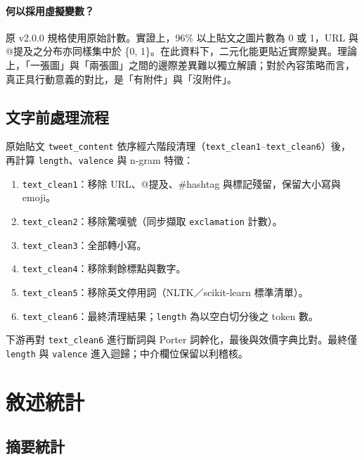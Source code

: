 \documentclass[12pt,a4paper]{ctexart}
\begin{document}
\paragraph{何以採用虛擬變數？}原 v2.0.0 規格使用原始計數。實證上，96\% 以上貼文之圖片數為 0 或 1，URL 與 @提及之分布亦同樣集中於 \{0, 1\}。在此資料下，二元化能更貼近實際變異。理論上，「一張圖」與「兩張圖」之間的邊際差異難以獨立解讀；對於內容策略而言，真正具行動意義的對比，是「有附件」與「沒附件」。

\subsection{文字前處理流程}
\label{sec:preproc}

原始貼文 \texttt{tweet\_content} 依序經六階段清理（\texttt{text\_clean1}--\texttt{text\_clean6}）後，再計算 \texttt{length}、\texttt{valence} 與 n-gram 特徵：

\begin{enumerate}
    \item \texttt{text\_clean1}：移除 URL、@提及、\#hashtag 與標記殘留，保留大小寫與 emoji。
    \item \texttt{text\_clean2}：移除驚嘆號（同步擷取 \texttt{exclamation} 計數）。
    \item \texttt{text\_clean3}：全部轉小寫。
    \item \texttt{text\_clean4}：移除剩餘標點與數字。
    \item \texttt{text\_clean5}：移除英文停用詞（NLTK／scikit-learn 標準清單）。
    \item \texttt{text\_clean6}：最終清理結果；\texttt{length} 為以空白切分後之 token 數。
\end{enumerate}

下游再對 \texttt{text\_clean6} 進行斷詞與 Porter 詞幹化，最後與效價字典比對。最終僅 \texttt{length} 與 \texttt{valence} 進入迴歸；中介欄位保留以利稽核。

\newpage

\section{敘述統計}

\subsection{摘要統計}
\end{document}
